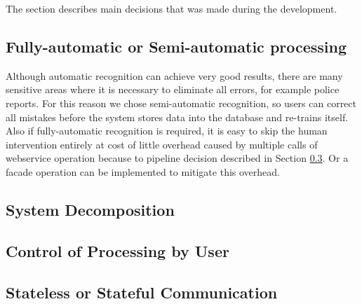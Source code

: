
The section describes main decisions that was made during the development. 



\subsection{Fully-automatic or Semi-automatic processing}



Although automatic recognition can achieve very good results, there are many
sensitive areas where it is necessary to eliminate all errors, for example
police reports. For this reason we chose semi-automatic recognition, so users
can correct all mistakes before the system stores data into the database and
re-trains itself. Also if fully-automatic recognition is required, it is easy
to skip the human intervention entirely at cost of little overhead caused by
multiple calls of webservice operation because to pipeline decision described in
Section \ref{ssec:ReportPipeline}. Or a facade operation can be implemented to
mitigate this overhead.

\subsection{System Decomposition}


\subsection{Control of Processing by User}
\label{ssec:ReportPipeline}


\subsection{Stateless or Stateful Communication}

